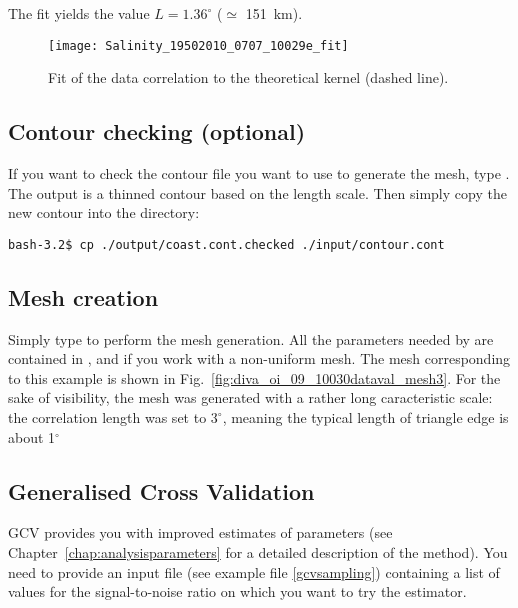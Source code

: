 The fit yields the value $L=1.36^{\circ}$ ($\simeq$ 151~km).

\begin{figure}[h!]
\centering
\texttt{[image: Salinity\_19502010\_0707\_10029e\_fit]}
\caption[Fit of the data correlation to the theoretical kernel.]{Fit of the data correlation to the theoretical kernel (dashed line). \label{fig:Salinity_19502010_0707_10029e_fit}}
\end{figure}



\subsection[Contour checking]{Contour checking (optional)}

If you want to check the contour file you want to use to generate the mesh, type . The output  is a thinned contour based on the length scale.
Then simply copy the new contour into the  directory:

\begin{lstlisting}[style=Bash]
bash-3.2$ cp ./output/coast.cont.checked ./input/contour.cont
\end{lstlisting}


\subsection{Mesh creation}

Simply type  to perform the mesh generation. All the parameters needed by \diva are contained in ,  and  if you work with a non-uniform mesh.
The mesh corresponding to this example is shown in Fig.~\ref{fig:diva_oi_09_10030dataval_mesh3}. For the sake of visibility, the mesh was generated with a rather long caracteristic scale: the correlation length was set to $3^{\circ}$, meaning the typical length of triangle edge is about 1$^{\circ}$


\subsection{Generalised Cross Validation}

GCV provides you with improved estimates of parameters (see Chapter~\ref{chap:analysisparameters} for a detailed description of the method). You need to provide an input file  (see example file \ref{gcvsampling}) containing a list of values for the signal-to-noise ratio on which you want to try the estimator.

